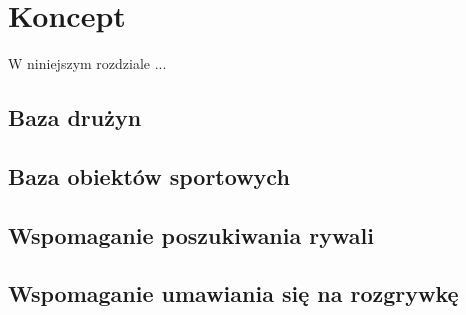 \chapter{Koncept}

W niniejszym rozdziale ...

\section{Baza drużyn}

\section{Baza obiektów sportowych}

\section{Wspomaganie poszukiwania rywali}

\section{Wspomaganie umawiania się na rozgrywkę}

